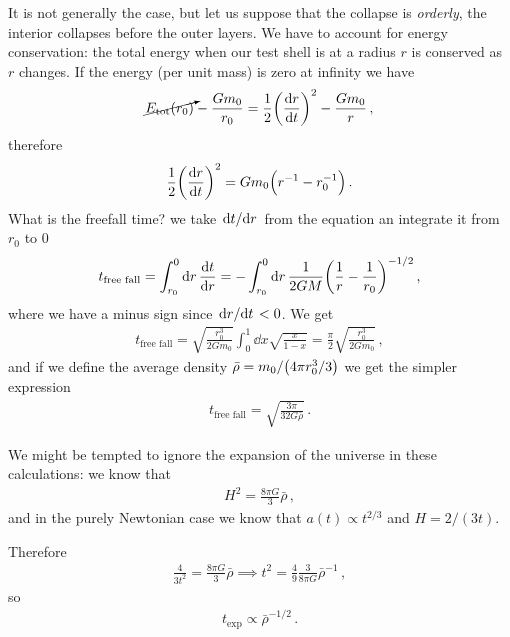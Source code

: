\documentclass[main.tex]{subfiles}
\begin{document}
It is not generally the case, but let us suppose that the collapse is \emph{orderly}, the interior collapses before the outer layers. 
We have to account for energy conservation: the total energy when our test shell is at a radius \(r\) is conserved as \(r\) changes. If the energy (per unit mass) is zero at infinity we have 
%
\begin{align}
  \cancelto{}{E _{\text{tot}} (r_0 )} - \frac{G m_0 }{r_0 } = \frac{1}{2} \qty(\dv{r}{t})^2 - \frac{Gm_0 }{r}
\,,
\end{align}
%
therefore 
%
\begin{align}
  \frac{1}{2} \qty(\dv{r}{t})^2= G m_0 \qty(r^{-1} - r_0^{-1})
\,. 
\end{align}
%
What is the freefall time? we take \(\dv*{t}{r}\) from the equation an integrate it from \(r_0 \) to \(0\)
%
\begin{align}
  t _{\text{free fall}} =  \int_{r_0 }^{0} \dd{r} \dv{t}{r}
  = - \int_{r_0 }^{0} \dd{r} \frac{1}{2GM}\qty(\frac{1}{r} - \frac{1}{r_0 })^{-1/2}
\,,
\end{align}
%
where we have a minus sign since \(\dv*{r}{t}<0\). We get 
%
\begin{align}
  t _{\text{free fall}} = \sqrt{\frac{r_0^3}{2 G m_0 }} \int_{0}^{1} \dd{x} \sqrt{\frac{x}{1-x}}
  = \frac{\pi}{2} \sqrt{\frac{r_0^3}{2 G m_0 }}
\,,
\end{align}
%
and if we define the average density \(\bar{\rho} = m_0 / \qty(4 \pi r_0^3 / 3)\) we get the simpler expression 
%
\begin{align}
  t _{\text{free fall}} = \sqrt{\frac{3 \pi }{32 G \bar{\rho} }}
\,.
\end{align}

We might be tempted to ignore the expansion of the universe in these calculations: we know that 
%
\begin{align}
  H^2 = \frac{8 \pi G}{3} \bar{\rho}
\,,
\end{align}
%
and in the purely Newtonian case we know that \(a(t) \propto t^{2/3}\) and \(H = 2/(3t)\). 

Therefore 
%
\begin{align}
  \frac{4}{3 t^2} = \frac{8 \pi G}{3} \bar{\rho} 
  \implies 
  t^2 = \frac{4}{9} \frac{3}{8 \pi G} \bar{\rho}^{-1}
\,,
\end{align}
%
so 
%
\begin{align}
  t _{\text{exp}} \propto \bar{\rho}^{- 1/2}
\,. 
\end{align}

\end{document}
